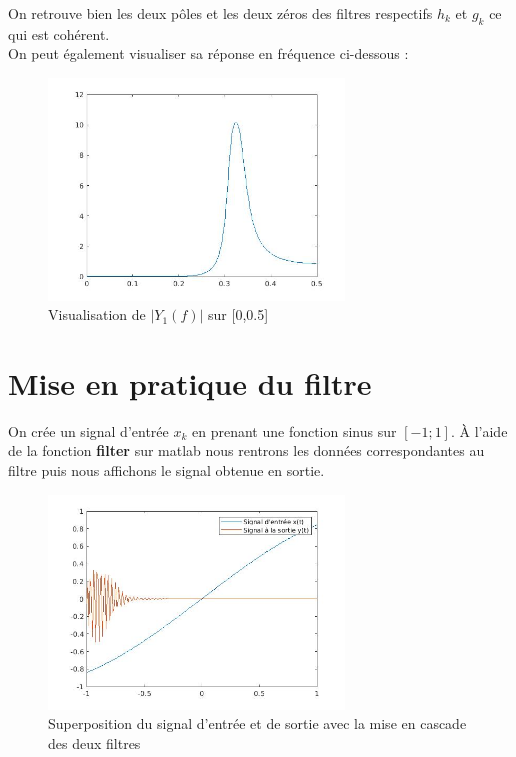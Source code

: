 \documentclass[12,french]{report}
\begin{document}
On retrouve bien les deux pôles et les deux zéros des filtres respectifs $h_k$ et $g_k$ ce qui est cohérent.\\

On peut également visualiser sa réponse en fréquence ci-dessous :

\begin{figure}[H]
	\center
	\includegraphics[width=0.7\textwidth]{./Images/freqz_Y1}
	\caption{Visualisation de $|Y_1(f)|$ sur [0,0.5]}
\end{figure}\vspace{0.2cm}


\section{Mise en pratique du filtre}

On crée un signal d'entrée $x_k$ en prenant une fonction sinus sur $[-1;1]$.
À l'aide de la fonction \textbf{filter} sur matlab nous rentrons les données correspondantes au filtre puis nous affichons le signal obtenue en sortie.
\begin{figure}[H]
	\center
	\includegraphics[width=0.7\textwidth]{./Images/filtercascade}
	\caption{Superposition du signal d'entrée et de sortie avec la mise en cascade des deux filtres}
\end{figure}\vspace{0.2cm}
\end{document}
